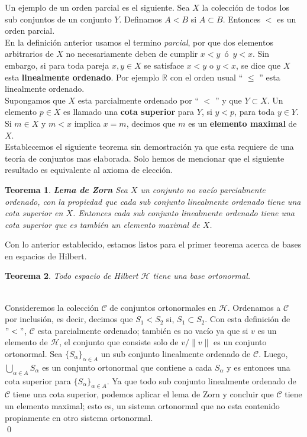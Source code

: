 \documentclass[12pt]{book}
\numberwithin{equation}{chapter}
\newtheorem{theorem}{Teorema}[chapter]
\def\n{\noindent}
\def\R{\mathbb{R}}
\def\c{\mathcal{C}}
\def\H{\mathcal{H}}
\begin{document}
Un ejemplo de un orden parcial es el siguiente. Sea $X$ la colecci\'on de todos los sub conjuntos de un conjunto $Y$. Definamos $A < B$ si $ A \subset B $. Entonces $<$ es un orden parcial.\\

En la definici\'on anterior usamos el termino \emph{parcial}, por que dos elementos arbitrarios de $X$ no necesariamente deben de cumplir $x<y\,$ \'o $\,y<x$. Sin embargo, si para toda pareja $x,y \in X$ se satisface $ x<y $ o $y<x$, se dice que $X$ esta {\bf linealmente ordenado}. Por ejemplo $\R$ con el orden usual `` $\leq$ '' esta linealmente ordenado.\\

Supongamos que $X$ esta parcialmente ordenado por `` $<$ '' y que $Y \subset X$. Un elemento $p \in X$ es llamado una {\bf cota superior} para $Y$, si $y<p$, para toda $y \in Y$. Si $ m \in X $ y $ m<x $ implica $x=m$, decimos que $m$ es un {\bf elemento maximal} de $X$. \\
Establecemos el siguiente teorema sin demostraci\'on ya que esta requiere de una teor\'ia de conjuntos mas elaborada. Solo hemos de mencionar que el siguiente resultado es equivalente al axioma de elecci\'on.

\begin{theorem}{\bf Lema de Zorn }
Sea $X$ un conjunto no vac\'io parcialmente ordenado, con la propiedad que cada sub conjunto linealmente ordenado tiene una cota superior en $X$. Entonces cada sub conjunto linealmente ordenado tiene una cota superior que es tambi\'en un elemento maximal de $X$.
\end{theorem}

\n Con lo anterior establecido, estamos listos para el primer teorema acerca de bases en espacios de Hilbert.

\begin{theorem}
Todo espacio de Hilbert $\H$ tiene una base ortonormal.
\end{theorem}
\n {\bf Demostraci\'on}\\
Consideremos la colecci\'on $\c$ de conjuntos ortonormales en $\H$. Ordenamos a $\c$ por inclusi\'on, es decir, decimos que $S_{1} < S_{2}$ si, $S_{1} \subset S_{2}$. Con esta definici\'on de $"<"$, $\c$ esta parcialmente ordenado; tambi\'en es no vac\'io ya que si $v$ es un elemento de $\H$, el conjunto que consiste solo de $v/\|v\|$ es un conjunto ortonormal. Sea $\{S_{\alpha}\}_{\alpha \in A}$ un sub conjunto linealmente ordenado de $\c$. Luego, $ \bigcup_{\alpha \in A} S_{\alpha}$ es un conjunto ortonormal que contiene a cada $S_{\alpha}$ y es entonces una cota superior para $\{S_{\alpha}\}_{\alpha \in A}$. Ya que todo sub conjunto linealmente ordenado de $\c$ tiene una cota superior, podemos aplicar el lema de Zorn y concluir que $\c$ tiene un elemento maximal; esto es, un sistema ortonormal que no esta contenido propiamente en otro sistema ortonormal. \\ \qed      
\end{document}
